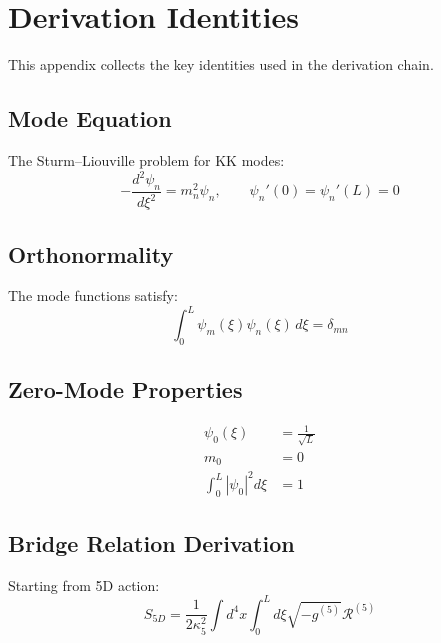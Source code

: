 \documentclass[11pt,a4paper]{article}
\theoremstyle{definition}
\theoremstyle{plain}
\theoremstyle{remark}
\begin{document}
\appendix

\section{Derivation Identities}
\label{app:identities}

This appendix collects the key identities used in the derivation chain.

\subsection{Mode Equation}

The Sturm--Liouville problem for KK modes:
\begin{equation}
-\frac{d^2\psi_n}{d\xi^2} = m_n^2 \psi_n, \qquad \psi_n'(0) = \psi_n'(L) = 0
\label{eq:app-mode-eq}
\end{equation}

\subsection{Orthonormality}

The mode functions satisfy:
\begin{equation}
\int_0^L \psi_m(\xi) \psi_n(\xi) \, d\xi = \delta_{mn}
\label{eq:app-orthonorm}
\end{equation}

\subsection{Zero-Mode Properties}

\begin{align}
\psi_0(\xi) &= \frac{1}{\sqrt{L}} \label{eq:app-psi0} \\
m_0 &= 0 \label{eq:app-m0} \\
\int_0^L |\psi_0|^2 d\xi &= 1 \label{eq:app-psi0-norm}
\end{align}

\subsection{Bridge Relation Derivation}

Starting from 5D action:
\begin{equation}
S_{5D} = \frac{1}{2\kappa_5^2} \int d^4x \int_0^L d\xi \sqrt{-g^{(5)}} \mathcal{R}^{(5)}
\label{eq:app-5d-action}
\end{equation}
\end{document}
